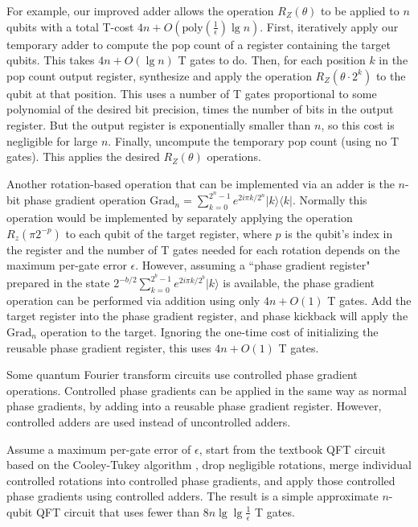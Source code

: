 \documentclass[twocolumn]{revtex4-1}
\begin{document}
For example, our improved adder allows the operation $R_Z(\theta)$ to be applied to $n$ qubits with a total T-cost $4n + O(\text{poly}(\frac{1}{\epsilon}) \lg n)$.
First, iteratively apply our temporary adder to compute the pop count of a register containing the target qubits.
This takes $4n + O(\lg n)$ T gates to do.
Then, for each position $k$ in the pop count output register, synthesize and apply the operation $R_Z(\theta \cdot 2^k)$ to the qubit at that position.
This uses a number of T gates proportional to some polynomial of the desired bit precision, times the number of bits in the output register.
But the output register is exponentially smaller than $n$, so this cost is negligible for large $n$.
Finally, uncompute the temporary pop count (using no T gates).
This applies the desired $R_Z(\theta)$ operations.

Another rotation-based operation that can be implemented via an adder is the $n$-bit phase gradient operation $\text{Grad}_n = \sum_{k=0}^{2^n-1} e^{2 i \pi k / 2^n} |k\rangle \langle k|$.
Normally this operation would be implemented by separately applying the operation $R_z(\pi 2^{-p})$ to each qubit of the target register, where $p$ is the qubit's index in the register and the number of T gates needed for each rotation depends on the maximum per-gate error $\epsilon$.
However, assuming a ``phase gradient register" prepared in the state $2^{-b/2} \sum_{k=0}^{2^b-1} e^{2 i \pi k / 2^b} |k\rangle$ is available, the phase gradient operation can be performed via addition using only $4n + O(1)$ T gates.
Add the target register into the phase gradient register, and phase kickback will apply the $\text{Grad}_n$ operation to the target.
Ignoring the one-time cost of initializing the reusable phase gradient register, this uses $4n + O(1)$ T gates.

Some quantum Fourier transform circuits use controlled phase gradient operations.
Controlled phase gradients can be applied in the same way as normal phase gradients, by adding into a reusable phase gradient register.
However, controlled adders are used instead of uncontrolled adders.

Assume a maximum per-gate error of $\epsilon$, start from the textbook QFT circuit based on the Cooley-Tukey algorithm \citep{Nielsen2009}, drop negligible rotations, merge individual controlled rotations into controlled phase gradients, and apply those controlled phase gradients using controlled adders.
The result is a simple approximate $n$-qubit QFT circuit that uses fewer than $8 n \lg \lg \frac{1}{\epsilon}$ T gates.
\end{document}
